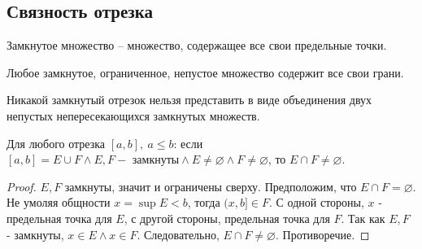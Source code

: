 \documentclass[12pt]{report}
\begin{document}
\subsection{Связность отрезка}\label{ques_8}
\begin{defn}
    Замкнутое множество -- множество, содержащее все свои предельные точки.
\end{defn}
\begin{note}
    Любое замкнутое, ограниченное, непустое множество содержит все свои грани.
\end{note}
\begin{thm}
    Никакой замкнутый отрезок нельзя представить в виде объединения двух непустых непересекающихся замкнутых множеств.\\

\end{thm}
Для любого отрезка $[a, b], ~a \le b$: если $[a, b] = E \cup F \wedge E,F - \mbox{ замкнуты} \wedge E \ne \varnothing \wedge F \ne \varnothing$, то $E \cap F \ne \varnothing$.
\begin{proof}
    $E, F$ замкнуты, значит и ограничены сверху. Предположим, что $E\cap F = \varnothing$. Не умоляя общности $x = \sup E < b$, тогда $ (x, b] \in F$. С одной стороны, $x$ - предельная точка для $E$, с другой стороны, предельная точка для $F$. Так как $E, F$ - замкнуты, $x \in E \wedge x \in F$. Следовательно, $E\cap F \ne \varnothing$. Противоречие.
\end{proof}
\end{document}
